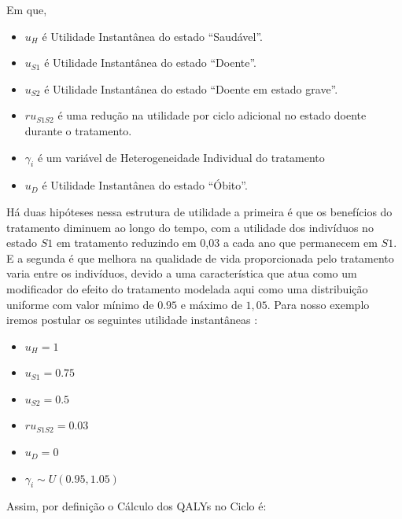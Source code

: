 \documentclass[12pt, a4paper, openany]{book}
\numberwithin{equation}{chapter}
\numberwithin{table}{chapter}
\numberwithin{figure}{chapter}
\theoremstyle{break}
\begin{document}
Em que,

\begin{itemize}
    \item $u_H$ é Utilidade Instantânea do estado ``Saudável''.

    \item $u_{S1}$ é Utilidade Instantânea do estado ``Doente''.

    \item $u_{S2}$ é Utilidade Instantânea do estado ``Doente em estado grave''.

    \item $ru_{S1S2}$ é uma redução na utilidade por ciclo adicional no estado doente durante o tratamento.

    \item $\gamma_{i}$ é um variável de Heterogeneidade Individual do tratamento

    \item $u_D$ é Utilidade Instantânea do estado ``Óbito''.

\end{itemize}


Há duas hipóteses nessa estrutura de utilidade a primeira é que  os benefícios do tratamento diminuem ao longo do tempo, com a utilidade dos indivíduos no estado $S1$ em tratamento reduzindo em 0,03 a cada ano que permanecem em $S1$. E a segunda é que melhora na qualidade de vida proporcionada pelo tratamento varia entre os indivíduos, devido a uma característica que atua como um modificador do efeito do tratamento modelada aqui como uma distribuição uniforme com valor mínimo de $0.95$ e máximo de $1,05$. Para nosso exemplo iremos postular os seguintes utilidade instantâneas :


\begin{itemize}
    \item $u_H=  1$

    \item $u_{S1} = 0.75$

    \item $u_{S2} =  0.5$

    \item $ru_{S1S2} = 0.03  $

    \item $u_D =  0$

    \item  $\gamma_i \sim U(0.95, 1.05)$


\end{itemize}


Assim, por definição o Cálculo dos QALYs no Ciclo é:
\end{document}

